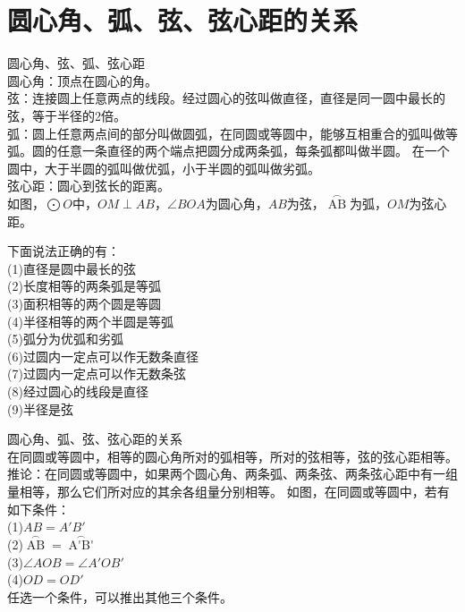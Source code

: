 \section{圆心角、弧、弦、弦心距的关系}
\begin{theorem}
    圆心角、弦、弧、弦心距 \\
    圆心角：顶点在圆心的角。 \\
    弦：连接圆上任意两点的线段。经过圆心的弦叫做直径，直径是同一圆中最长的弦，等于半径的2倍。\\
    弧：圆上任意两点间的部分叫做圆弧，在同圆或等圆中，能够互相重合的弧叫做等弧。圆的任意一条直径的两个端点把圆分成两条弧，每条弧都叫做半圆。
    在一个圆中，大于半圆的弧叫做优弧，小于半圆的弧叫做劣弧。\\
    弦心距：圆心到弦长的距离。 \\
    如图，$\bigodot O$中，$OM\perp AB$，$\angle BOA$为圆心角，$AB$为弦，$\mathop{AB}\limits^\frown$为弧，$OM$为弦心距。
\end{theorem}
\begin{problem}
下面说法正确的有：\\
(1)直径是圆中最长的弦 \\
(2)长度相等的两条弧是等弧 \\
(3)面积相等的两个圆是等圆 \\
(4)半径相等的两个半圆是等弧 \\
(5)弧分为优弧和劣弧 \\
(6)过圆内一定点可以作无数条直径 \\
(7)过圆内一定点可以作无数条弦 \\
(8)经过圆心的线段是直径 \\
(9)半径是弦
\end{problem}
\begin{theorem}
    圆心角、弧、弦、弦心距的关系 \\
    在同圆或等圆中，相等的圆心角所对的弧相等，所对的弦相等，弦的弦心距相等。\\
    推论：在同圆或等圆中，如果两个圆心角、两条弧、两条弦、两条弦心距中有一组量相等，那么它们所对应的其余各组量分别相等。
    如图，在同圆或等圆中，若有如下条件： \\
    (1)$AB=A'B'$ \\
    (2)$\mathop{AB}\limits^{\frown}=\mathop{A'B'}\limits^{\frown}$ \\
    (3)$\angle AOB=\angle A'OB'$ \\
    (4)$OD=OD'$ \\
    任选一个条件，可以推出其他三个条件。
\end{theorem}
\clearpage
